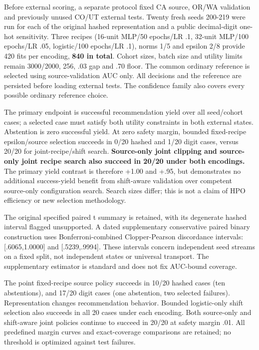 \documentclass[
  10pt,
]{article}
\begin{document}
Before external scoring, a separate protocol fixed CA source, OR/WA
validation and previously unused CO/UT external tests. Twenty fresh
seeds 200-219 were run for each of the original hashed representation
and a public decimal-digit one-hot sensitivity. Three recipes (16-unit
MLP/50 epochs/LR .1, 32-unit MLP/100 epochs/LR .05, logistic/100
epochs/LR .1), norms 1/5 and epsilon 2/8 provide 420 fits per encoding,
\textbf{840 in total}. Cohort sizes, batch size and utility limits
remain 3000/2000, 256, .03 gap and .70 floor. The common ordinary
reference is selected using source-validation AUC only. All decisions
and the reference are persisted before loading external tests. The
confidence family also covers every possible ordinary reference choice.

The primary endpoint is successful recommendation yield over all
seed/cohort cases; a selected case must satisfy both utility constraints
in both external states. Abstention is zero successful yield. At zero
safety margin, bounded fixed-recipe epsilon/source selection succeeds in
0/20 hashed and 1/20 digit cases, versus 20/20 for joint-recipe/shift
search. \textbf{Source-only joint clipping and source-only joint recipe
search also succeed in 20/20 under both encodings.} The primary yield
contrast is therefore +1.00 and +.95, but demonstrates no additional
success-yield benefit from shift-aware validation over competent
source-only configuration search. Search sizes differ; this is not a
claim of HPO efficiency or new selection methodology.

The original specified paired t summary is retained, with its degenerate
hashed interval flagged unsupported. A dated supplementary conservative
paired binary construction uses Bonferroni-combined Clopper-Pearson
discordance intervals: {[}.6065,1.0000{]} and {[}.5239,.9994{]}. These
intervals concern independent seed streams on a fixed split, not
independent states or universal transport. The supplementary estimator
is standard and does not fix AUC-bound coverage.

The point fixed-recipe source policy succeeds in 10/20 hashed cases (ten
abstentions), and 17/20 digit cases (one abstention, two selected
failures). Representation changes recommendation behavior. Bounded
logistic-only shift selection also succeeds in all 20 cases under each
encoding. Both source-only and shift-aware joint policies continue to
succeed in 20/20 at safety margin .01. All predefined margin curves and
exact-coverage comparisons are retained; no threshold is optimized
against test failures.
\end{document}
